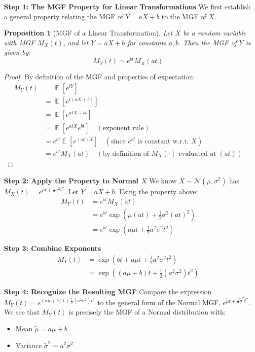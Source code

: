 \documentclass[11pt, letterpaper]{article}
\newtheorem{proposition}[theorem]{Proposition}
\theoremstyle{definition}
\theoremstyle{remark}
\DeclareMathOperator{\E}{\mathbb{E}} %
\begin{document}
\textbf{Step 1: The MGF Property for Linear Transformations}
We first establish a general property relating the MGF of $Y=aX+b$ to the MGF of $X$.
\begin{proposition}[MGF of a Linear Transformation]
Let $X$ be a random variable with MGF $M_X(t)$, and let $Y=aX+b$ for constants $a, b$. Then the MGF of $Y$ is given by:
$$ M_Y(t) = e^{bt} M_X(at) $$
\end{proposition}
\begin{proof}
By definition of the MGF and properties of expectation:
\begin{align*}
    M_Y(t) &= \E[e^{tY}] \\
           &= \E[e^{t(aX+b)}] \\
           &= \E[e^{atX + bt}] \\
           &= \E[e^{atX} e^{bt}] \quad (\text{exponent rule}) \\
           &= e^{bt} \E[e^{(at)X}] \quad (\text{since } e^{bt} \text{ is constant w.r.t. } X) \\
           &= e^{bt} M_X(at) \quad (\text{by definition of } M_X(\cdot) \text{ evaluated at } (at))
\end{align*}
\end{proof}

\textbf{Step 2: Apply the Property to Normal $X$}
We know $X \sim \mathcal{N}(\mu, \sigma^2)$ has $M_X(t) = e^{\mu t + \frac{1}{2}\sigma^2 t^2}$.
Let $Y = aX+b$. Using the property above:
\begin{align*}
    M_Y(t) &= e^{bt} M_X(at) \\
           &= e^{bt} \exp\left( \mu(at) + \frac{1}{2}\sigma^2 (at)^2 \right) \\
           &= e^{bt} \exp\left( a\mu t + \frac{1}{2}a^2\sigma^2 t^2 \right) 
\end{align*}

\textbf{Step 3: Combine Exponents}
\begin{align*}
    M_Y(t) &= \exp\left( bt + a\mu t + \frac{1}{2}a^2\sigma^2 t^2 \right) \\
           &= \exp\left( (a\mu + b)t + \frac{1}{2}(a^2 \sigma^2) t^2 \right) 
\end{align*}

\textbf{Step 4: Recognize the Resulting MGF}
Compare the expression $M_Y(t) = e^{(a\mu+b)t + \frac{1}{2}(a^2\sigma^2)t^2}$ to the general form of the Normal MGF, $e^{\tilde{\mu}t + \frac{1}{2}\tilde{\sigma}^2 t^2}$.
We see that $M_Y(t)$ is precisely the MGF of a Normal distribution with:
\begin{itemize}
    \item Mean $\tilde{\mu} = a\mu + b$
    \item Variance $\tilde{\sigma}^2 = a^2 \sigma^2$
\end{itemize}
\end{document}
